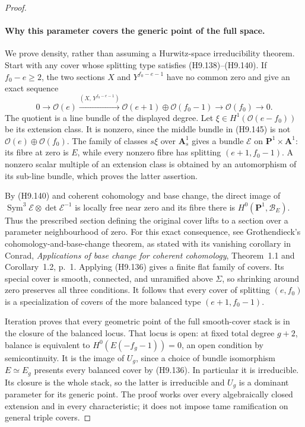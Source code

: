 \begin{proof}
\paragraph{Why this parameter covers the generic point of the full space.}
We prove density, rather than assuming a Hurwitz-space
irreducibility theorem. Start with any cover whose
splitting type satisfies (H9.138)--(H9.140). If
$f_0-e\ge2$, the two sections $X$ and
$Y^{f_0-e-1}$ have no common zero and give an exact
sequence
\[
 0\longrightarrow\mathcal O(e)
   \xrightarrow{(X,\,Y^{f_0-e-1})}
   \mathcal O(e+1)\oplus\mathcal O(f_0-1)
   \longrightarrow\mathcal O(f_0)\longrightarrow0.
                                                               \tag{H9.145}
\]
The quotient is a line bundle of the displayed degree.
Let $\xi\in H^1(\mathcal O(e-f_0))$ be its extension
class. It is nonzero, since the middle bundle in
(H9.145) is not $\mathcal O(e)\oplus\mathcal O(f_0)$.
The family of classes $s\xi$ over $\mathbf A^1_s$
gives a bundle $\mathscr E$ on
$\mathbf P^1\times\mathbf A^1$: its fibre at zero is
$E$, while every nonzero fibre has splitting
$(e+1,f_0-1)$. A nonzero scalar multiple of an
extension class is obtained by an automorphism of
its sub-line bundle, which proves the latter assertion.

By (H9.140) and coherent cohomology and base change,
the direct image of
$\operatorname{Sym}^3\mathscr E\otimes\det\mathscr E^{-1}$
is locally free near zero and its fibre there is
$H^0(\mathbf P^1,\mathcal B_E)$. Thus the prescribed
section defining the original cover lifts to a
section over a parameter neighbourhood of zero.
For this exact consequence, see Grothendieck's
cohomology-and-base-change theorem, as stated with
its vanishing corollary in Conrad, \emph{Applications
of base change for coherent cohomology},
Theorem~1.1 and Corollary~1.2, p.~1.
Applying (H9.136) gives a finite flat family of covers.
Its special cover is smooth, connected, and
unramified above $\Sigma$, so shrinking around zero
preserves all three conditions. It follows that every
cover of splitting $(e,f_0)$ is a specialization of
covers of the more balanced type $(e+1,f_0-1)$.

Iteration proves that every geometric point of the
full smooth-cover stack is in the closure of the
balanced locus. That locus is open: at fixed total
degree $g+2$, balance is equivalent to
$H^0(E(-f_g-1))=0$, an open condition by
semicontinuity. It is the image of $U_g$, since a
choice of bundle isomorphism $E\simeq E_g$ presents
every balanced cover by (H9.136). In particular it
is irreducible. Its closure is the whole stack, so
the latter is irreducible and $U_g$ is a dominant
parameter for its generic point. The proof works
over every algebraically closed extension and in
every characteristic; it does not impose tame
ramification on general triple covers.


\end{proof}
